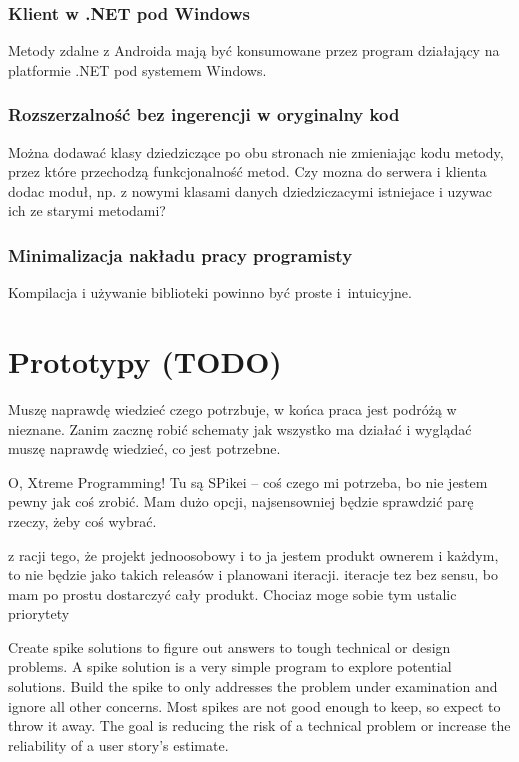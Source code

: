 \subsubsection{Klient w .NET pod Windows}
Metody zdalne z Androida mają być konsumowane przez program działający na platformie .NET pod systemem Windows.

\subsubsection{Rozszerzalność bez ingerencji w oryginalny kod}
Można dodawać klasy dziedziczące po obu stronach nie zmieniając kodu metody, przez które przechodzą funkcjonalność metod.
Czy mozna do serwera i klienta dodac moduł, np.
z nowymi klasami danych dziedziczacymi istniejace
i uzywac ich ze starymi metodami?

\subsubsection{Minimalizacja nakładu pracy programisty}
Kompilacja i używanie biblioteki powinno być proste i~intuicyjne.



\section{Prototypy (TODO)}
Muszę naprawdę wiedzieć czego potrzbuje, w końca praca jest podróżą w nieznane. Zanim zacznę robić schematy jak wszystko ma działać i wyglądać muszę naprawdę wiedzieć, co jest potrzebne.

O, Xtreme Programming! Tu są SPikei -- coś czego mi potrzeba, bo nie jestem pewny jak coś zrobić. Mam dużo opcji, najsensowniej będzie sprawdzić parę rzeczy, żeby coś wybrać.

z racji tego, że projekt jednoosobowy i to ja jestem produkt ownerem i każdym, to nie będzie jako takich releasów i planowani iteracji. iteracje tez bez sensu, bo mam po prostu dostarczyć cały produkt. Chociaz moge sobie tym ustalic priorytety

Create spike solutions to figure out answers to tough technical or design problems. A spike solution is a very simple program to explore potential solutions. Build the spike to only addresses the problem under examination and ignore all other concerns. Most spikes are not good enough to keep, so expect to throw it away. The goal is reducing the risk of a technical problem or increase the reliability of a user story's estimate.

